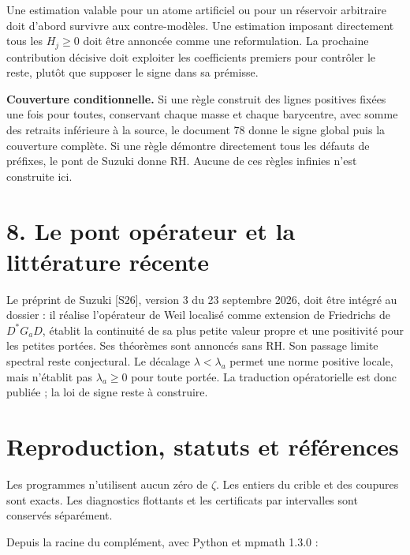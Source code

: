 \documentclass[
  11pt,
  a4paper,
]{article}
\begin{document}
Une estimation valable pour un atome artificiel ou pour un réservoir
arbitraire doit d'abord survivre aux contre-modèles. Une estimation
imposant directement tous les \(H_j\ge0\) doit être annoncée comme une
reformulation. La prochaine contribution décisive doit exploiter les
coefficients premiers pour contrôler le reste, plutôt que supposer le
signe dans sa prémisse.

\textbf{Couverture conditionnelle.} Si une règle construit des lignes
positives fixées une fois pour toutes, conservant chaque masse et chaque
barycentre, avec somme des retraits inférieure à la source, le document
78 donne le signe global puis la couverture complète. Si une règle
démontre directement tous les défauts de préfixes, le pont de Suzuki
donne RH. Aucune de ces règles infinies n'est construite ici.

\hypertarget{le-pont-opuxe9rateur-et-la-littuxe9rature-ruxe9cente}{%
\section{8. Le pont opérateur et la littérature
récente}\label{le-pont-opuxe9rateur-et-la-littuxe9rature-ruxe9cente}}

Le préprint de Suzuki {[}S26{]}, version 3 du 23 septembre 2026, doit
être intégré au dossier : il réalise l'opérateur de Weil localisé comme
extension de Friedrichs de \(D^*G_aD\), établit la continuité de sa plus
petite valeur propre et une positivité pour les petites portées. Ses
théorèmes sont annoncés sans RH. Son passage limite spectral reste
conjectural. Le décalage \(\lambda<\lambda_a\) permet une norme positive
locale, mais n'établit pas \(\lambda_a\ge0\) pour toute portée. La
traduction opératorielle est donc publiée ; la loi de signe reste à
construire.

\newpage

\hypertarget{reproduction-statuts-et-ruxe9fuxe9rences}{%
\section{Reproduction, statuts et
références}\label{reproduction-statuts-et-ruxe9fuxe9rences}}

Les programmes n'utilisent aucun zéro de \(\zeta\). Les entiers du
crible et des coupures sont exacts. Les diagnostics flottants et les
certificats par intervalles sont conservés séparément.

Depuis la racine du complément, avec Python et mpmath 1.3.0 :
\end{document}
